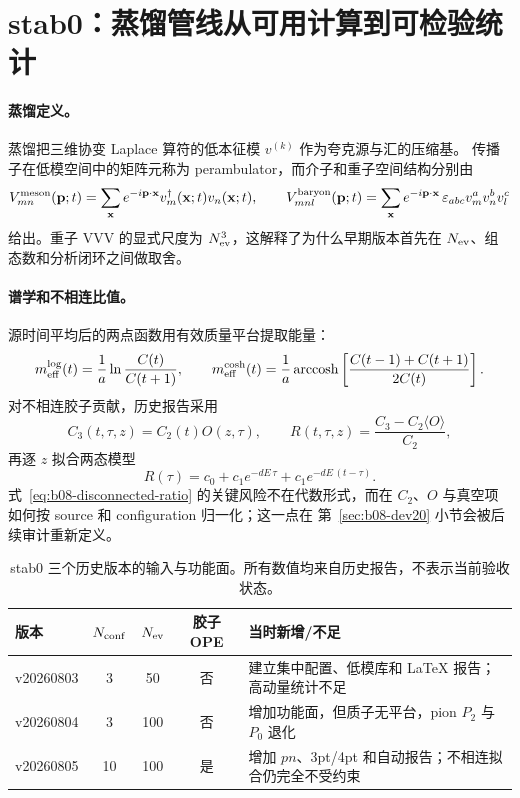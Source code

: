 \section{stab0：蒸馏管线从可用计算到可检验统计}

\paragraph{蒸馏定义。}
蒸馏把三维协变 Laplace 算符的低本征模 \(v^{(k)}\) 作为夸克源与汇的压缩基。
传播子在低模空间中的矩阵元称为 perambulator，而介子和重子空间结构分别由
\begin{equation}
  V^{\rm meson}_{mn}(\mathbf p;t)
  =\sum_{\mathbf x}e^{-i\mathbf p\cdot\mathbf x}
  v_m^\dagger(\mathbf x;t)v_n(\mathbf x;t),
  \qquad
  V^{\rm baryon}_{mnl}(\mathbf p;t)
  =\sum_{\mathbf x}e^{-i\mathbf p\cdot\mathbf x}\,
  \varepsilon_{abc}v_m^a v_n^b v_l^c
  \label{eq:b08-vertices}
\end{equation}
给出。重子 VVV 的显式尺度为 \(N_{\rm ev}^3\)，这解释了为什么早期版本首先在
\(N_{\rm ev}\)、组态数和分析闭环之间做取舍。

\paragraph{谱学和不相连比值。}
源时间平均后的两点函数用有效质量平台提取能量：
\begin{equation}
  m_{\rm eff}^{\log}(t)=\frac1a\ln\frac{C(t)}{C(t+1)},
  \qquad
  m_{\rm eff}^{\cosh}(t)=\frac1a\operatorname{arccosh}
  \left[\frac{C(t-1)+C(t+1)}{2C(t)}\right].
  \label{eq:b08-meff}
\end{equation}
对不相连胶子贡献，历史报告采用
\begin{equation}
  C_3(t,\tau,z)=C_2(t)O(z,\tau),
  \qquad
  R(t,\tau,z)=\frac{C_3-C_2\langle O\rangle}{C_2},
  \label{eq:b08-disconnected-ratio}
\end{equation}
再逐 \(z\) 拟合两态模型
\begin{equation}
  R(\tau)=c_0+c_1e^{-dE\,\tau}+c_1e^{-dE\,(t-\tau)}.
  \label{eq:b08-two-state}
\end{equation}
式~\eqref{eq:b08-disconnected-ratio} 的关键风险不在代数形式，而在
\(C_2\)、\(O\) 与真空项如何按 source 和 configuration 归一化；这一点在
第~\ref{sec:b08-dev20} 小节会被后续审计重新定义。

\begin{table}[htbp]
\centering
\caption{stab0 三个历史版本的输入与功能面。所有数值均来自历史报告，不表示当前验收状态。}
\label{tab:b08-stab0-versions}
\small
\begin{tabular}{>{\raggedright\arraybackslash}p{2.2cm}ccc>{\raggedright\arraybackslash}p{7.0cm}}
\toprule
版本 & \(N_{\rm conf}\) & \(N_{\rm ev}\) & 胶子 OPE & 当时新增/不足 \\
\midrule
v20260803 & 3 & 50 & 否 &
建立集中配置、低模库和 LaTeX 报告；高动量统计不足 \\
v20260804 & 3 & 100 & 否 &
增加功能面，但质子无平台，pion \(P_2\) 与 \(P_0\) 退化 \\
v20260805 & 10 & 100 & 是 &
增加 \(pn\)、3pt/4pt 和自动报告；不相连拟合仍完全不受约束 \\
\bottomrule
\end{tabular}
\end{table}

